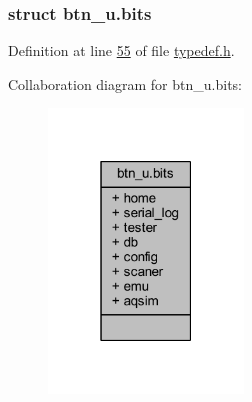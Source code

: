 \subsubsection{struct btn\+\_\+u.\+bits}


Definition at line \hyperlink{a00001_source_l00055}{55} of file \hyperlink{a00001_source}{typedef.\+h}.



Collaboration diagram for btn\+\_\+u.\+bits\+:
\nopagebreak
\begin{figure}[H]
\begin{center}
\leavevmode
\includegraphics[width=147pt]{de/dbc/a00249}
\end{center}
\end{figure}
